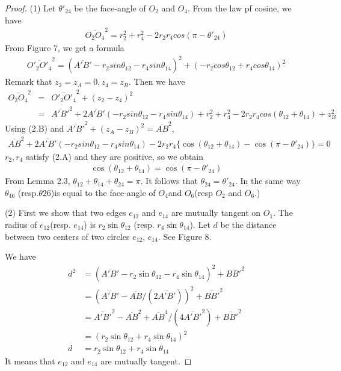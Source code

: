 \documentclass[dvipdfmx]{interact}
\theoremstyle{plain}%
\theoremstyle{definition}
\theoremstyle{remark}
\theoremstyle{problemstyle}
\begin{document}
\begin{proof}
 (1) Let $\theta'_{24}$ be the face-angle of $O_2$ and $O_4$. From the
 law pf cosine, we have
 \begin{eqnarray}
  \overline{O_2O_4}^2 = r_2^2 + r_4^2 - 2r_2r_4cos(\pi-\theta'_{24})
 \end{eqnarray}
From Figure 7, we get a formula
\begin{eqnarray*}
 \overline{O'_2O'_4}^2 = (\overline{A'B'} - r_2sin\theta_{12}-
  r_4sin\theta_{14})^2 + (-r_2cos\theta_{12} + r_4 cos \theta_{14})^2
\end{eqnarray*}
 Remark that $z_2 = z_A= 0, z_4 = z_B$. Then we have
\begin{eqnarray*}
 \overline{O_2O_4}^2 &=& \overline{O'_2O'_4}^2 + (z_2-z_4)^2\\
 &=&\overline{A'B'}^2 + 2 \overline{A'B'}(-r_2sin\theta_{12} -
  r_4sin\theta_{14}) + r^2_2 + r^2_4 -2r_2r_4cos(\theta_{12} +
  \theta_{14}) + z^2_B
\end{eqnarray*}
Using (2.B) and $\overline{A'B'}^2 + (z_A-z_B)^2 = \overline{AB}^2$,
\begin{eqnarray*}
 \overline{AB}^2 + 2\overline{A'B'}(-r_2sin\theta_{12} -
  r_4sin\theta_{14}) - 2r_2r_4\{\cos(\theta_{12} + \theta_{14}) -
  \cos(\pi- \theta'_{24})\} = 0
\end{eqnarray*}
 $r_2, r_4$ satisfy (2.A) and they are positive, so we obtain
\begin{eqnarray*}
 \cos(\theta_{12} + \theta_{14}) = \cos(\pi - \theta'_{24})
\end{eqnarray*}
From Lemma 2.3, $\theta_{12} + \theta_{14} + \theta_{24} = \pi$. It
 follows that $\theta_24 = \theta'_24$. In the same way $\theta_{46}$
 (resp.$\theta{26}$)is equal to the face-angle of $O_4$and $O_6$(resp
 $O_2$ and $O_6$.)

(2) First we show that two edges $e_{12}$ and $e_{14}$ are mutually tangent
 on $O_1$. The radius of $e_{12}$(resp. $e_{14}$) is
 $r_2\sin\theta_{12}$ (resp. $r_4\sin\theta_{14}$). Let $d$ be the
 distance between two centers of two circles $e_{12}$, $e_{14}$. See
 Figure 8.

We have
 \begin{align*}
d^2&= (\overline{A'B'} - r_2\sin\theta_{12}-r_4\sin\theta_{14})^2 + \overline{BB'}^2\\
&= (\overline{A'B'} - \overline{AB}/(2\overline{A'B'}))^2 + \overline{BB'}^2\\
&= \overline{A'B'}^2 - \overline{AB}^2 +\overline{AB}^4/(4\overline{A'B'}^2) + \overline{BB'}^2\\
&=(r_2\sin\theta_{12} + r_4\sin\theta_{14})^2\\
d&= r_2\sin\theta_12 + r_4\sin\theta_{14}
 \end{align*}
It means that $e_{12}$ and $e_{14}$ are mutually tangent.


\end{proof}
\end{document}
